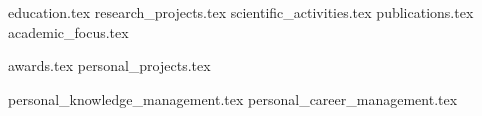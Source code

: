 \documentclass[letterpaper,11pt]{article}
\begin{document}


\vspace{-1.1cm}
{education.tex}
\vspace{-1.3cm}
{research_projects.tex}
{scientific_activities.tex}
\vspace{-1.3cm}
{publications.tex}
{academic_focus.tex}

\pagebreak

{awards.tex}
\vspace{-1.2cm}
{personal_projects.tex}


{personal_knowledge_management.tex}
{personal_career_management.tex}
\end{document}
